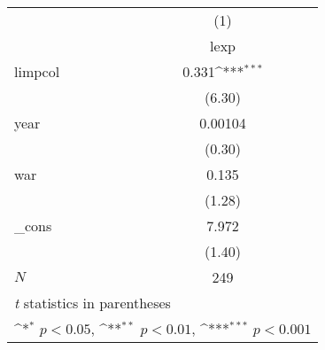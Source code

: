{
\def\sym#1{\ifmmode^{#1}\else\(^{#1}\)\fi}
\begin{tabular}{l*{1}{c}}
\hline\hline
            &\multicolumn{1}{c}{(1)}\\
            &\multicolumn{1}{c}{lexp}\\
\hline
limpcol     &       0.331\sym{***}\\
            &      (6.30)         \\
[1em]
year        &     0.00104         \\
            &      (0.30)         \\
[1em]
war         &       0.135         \\
            &      (1.28)         \\
[1em]
\_cons      &       7.972         \\
            &      (1.40)         \\
\hline
\(N\)       &         249         \\
\hline\hline
\multicolumn{2}{l}{\footnotesize \textit{t} statistics in parentheses}\\
\multicolumn{2}{l}{\footnotesize \sym{*} \(p<0.05\), \sym{**} \(p<0.01\), \sym{***} \(p<0.001\)}\\
\end{tabular}
}

